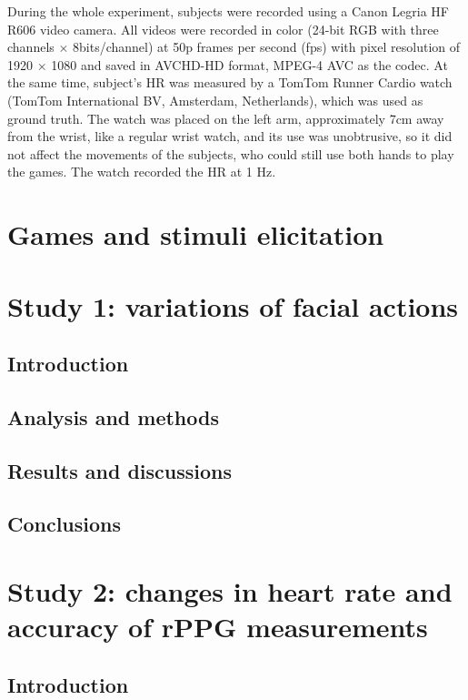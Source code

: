 During the whole experiment, subjects were recorded using a Canon Legria HF R606 video camera. All videos were recorded in color (24-bit RGB with three channels $\times$ 8bits/channel) at 50p frames per second (fps) with pixel resolution of 1920 $\times$ 1080 and saved in AVCHD-HD format, MPEG-4 AVC as the codec. At the same time, subject's HR was measured by a TomTom Runner Cardio watch (TomTom International BV, Amsterdam, Netherlands), which was used as ground truth. The watch was placed on the left arm, approximately 7cm away from the wrist, like a regular wrist watch, and its use was unobtrusive, so it did not affect the movements of the subjects, who could still use both hands to play the games. The watch recorded the HR at 1 Hz.

\section{Games and stimuli elicitation}

\section{Study 1: variations of facial actions}
\subsection{Introduction}
\subsection{Analysis and methods}
\subsection{Results and discussions}
\subsection{Conclusions}

\section{Study 2: changes in heart rate and accuracy of rPPG measurements}

\subsection{Introduction}

